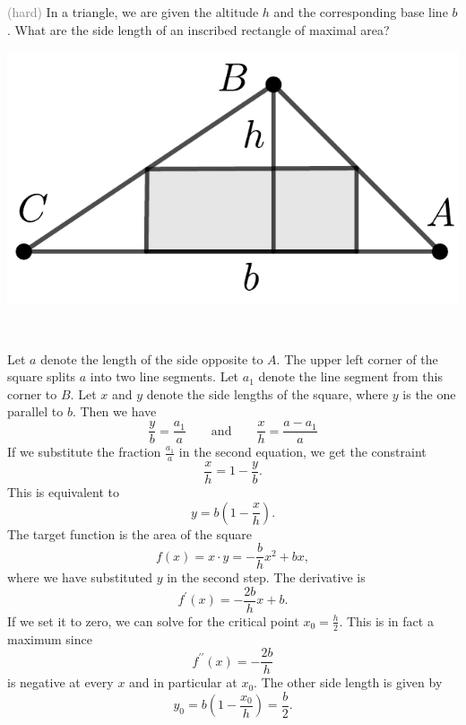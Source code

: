 \begin{minipage}{0.7\textwidth}
\begin{exercise}
	\textcolor{gray}{(hard)} In a triangle, we are given the altitude $h$ and the corresponding base line $b$.
	What are the side length of an inscribed rectangle of maximal area?
\end{exercise}
\end{minipage}\hfill
\begin{minipage}{0.25\textwidth}
	\includegraphics[width=\textwidth]{images/triangle}
\end{minipage}\\
\begin{solution*}
	Let $a$ denote the length of the side opposite to $A$.
	The upper left corner of the square splits $a$ into two line segments.
	Let $a_1$ denote the line segment from this corner to $B$.
	Let $x$ and $y$ denote the side lengths of the square, where $y$ is the one parallel to $b$.
	Then we have
	\begin{equation*}
		\frac{y}{b}=\frac{a_1}{a}
		\qquad\text{and}\qquad
		\frac{x}{h}=\frac{a-a_1}{a}
	\end{equation*}
	If we substitute the fraction $\frac{a_1}{a}$ in the second equation, we get the constraint
	\begin{equation*}
		\frac{x}{h}=1-\frac{y}{b}.
	\end{equation*}
	This is equivalent to
	\begin{equation*}
		y=b\left(1-\frac{x}{h}\right).
	\end{equation*}
	The target function is the area of the square
	\begin{equation*}
		f\left(x\right)=x\cdot y=-\frac{b}{h}x^2+bx,
	\end{equation*}
	where we have substituted $y$ in the second step.
	The derivative is
	\begin{equation*}
		f^{\prime}\left(x\right)=-\frac{2b}{h}x+b.
	\end{equation*}
	If we set it to zero, we can solve for the critical point $x_0=\frac{h}{2}$.
	This is in fact a maximum since
	\begin{equation*}
		f^{\prime\prime}\left(x\right)=-\frac{2b}{h}
	\end{equation*}
	is negative at every $x$ and in particular at $x_0$.
	The other side length is given by
	\begin{equation*}
		y_0=b\left(1-\frac{x_0}{h}\right)=\frac{b}{2}.
	\end{equation*}
\end{solution*}